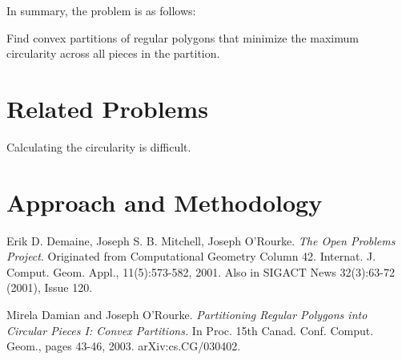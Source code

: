 \documentclass[11pt]{article}
\begin{document}
In summary, the problem is as follows:
\begin{goal*}Find convex partitions of regular polygons that minimize the maximum circularity across all pieces in the partition.
\end{goal*}

\section{Related Problems}

Calculating the circularity is difficult. 

\section{Approach and Methodology}

\newpage

\begin{thebibliography}{9}
    Erik D. Demaine, Joseph S. B. Mitchell, Joseph O'Rourke. \textit{The Open Problems Project}. 
    Originated from Computational Geometry Column 42. Internat. J. Comput. Geom. Appl., 11(5):573-582, 2001. Also in SIGACT News 32(3):63-72 (2001), Issue 120.

    Mirela Damian and Joseph O'Rourke. \textit{Partitioning Regular Polygons into Circular Pieces I: Convex Partitions.} In Proc. 15th Canad. Conf. Comput. Geom., pages 43-46, 2003. arXiv:cs.CG/030402.    


\end{thebibliography}
\end{document}
